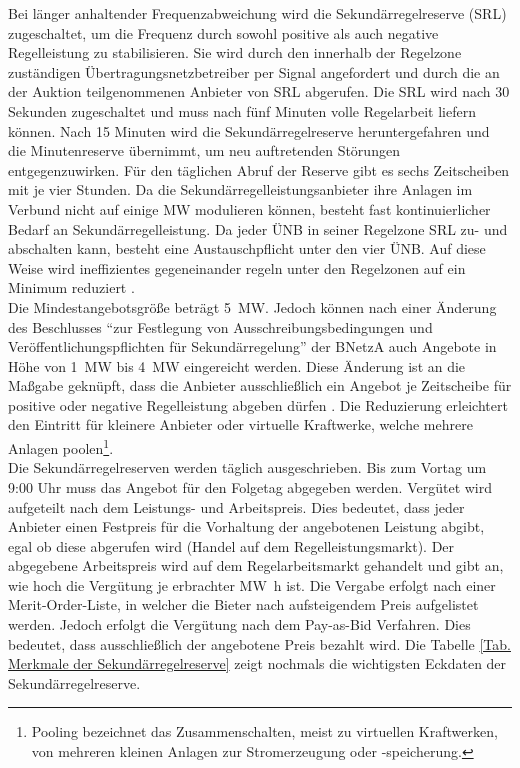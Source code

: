 			Bei länger anhaltender Frequenzabweichung wird die Sekundärregelreserve (SRL) zugeschaltet, um die Frequenz durch sowohl positive als auch negative Regelleistung zu stabilisieren.
			Sie wird durch den innerhalb der Regelzone zuständigen Übertragungsnetzbetreiber per Signal angefordert und durch die an der Auktion teilgenommenen Anbieter von SRL abgerufen. 
			Die SRL wird nach \num{30} Sekunden zugeschaltet und muss nach fünf Minuten volle Regelarbeit liefern können. 
			Nach \num{15} Minuten wird die Sekundärregelreserve heruntergefahren und die Minutenreserve übernimmt, um neu auftretenden Störungen entgegenzuwirken.
			Für den täglichen Abruf der Reserve gibt es sechs Zeitscheiben mit je vier Stunden.
			Da die Sekundärregelleistungsanbieter ihre Anlagen im Verbund nicht auf einige \si{\mega\watt} modulieren können, besteht fast kontinuierlicher Bedarf an Sekundärregelleistung.
			Da jeder ÜNB in seiner Regelzone SRL zu- und abschalten kann, besteht eine Austauschpflicht unter den vier ÜNB.
			Auf diese Weise wird ineffizientes gegeneinander regeln unter den Regelzonen auf ein Minimum reduziert \parencite{SRL_NextKraftwerke}. \\
			
			Die Mindestangebotsgröße beträgt \SI{5}{\mega\watt}.
			Jedoch können nach einer Änderung des Beschlusses "`zur Festlegung von Ausschreibungsbedingungen und Veröffentlichungspflichten für Sekundärregelung"' der BNetzA auch Angebote in Höhe von \SI{1}{\mega\watt} bis \SI{4}{\mega\watt} eingereicht werden.
			Diese Änderung ist an die Maßgabe geknüpft, dass die Anbieter ausschließlich ein Angebot je Zeitscheibe für positive oder negative Regelleistung abgeben dürfen \parencite{Beschluss_SRL}.
			Die Reduzierung erleichtert den Eintritt für kleinere Anbieter oder virtuelle Kraftwerke, welche mehrere Anlagen poolen\footnote{Pooling bezeichnet das Zusammenschalten, meist zu virtuellen Kraftwerken, von mehreren kleinen Anlagen zur Stromerzeugung oder -speicherung.}. \\
			
			Die Sekundärregelreserven werden täglich ausgeschrieben. 
			Bis zum Vortag um 9:00 Uhr muss das Angebot für den Folgetag abgegeben werden.
			Vergütet wird aufgeteilt nach dem Leistungs- und Arbeitspreis.
			Dies bedeutet, dass jeder Anbieter einen Festpreis für die Vorhaltung der angebotenen Leistung abgibt, egal ob diese abgerufen wird (Handel auf dem Regelleistungsmarkt).
			Der abgegebene Arbeitspreis wird auf dem Regelarbeitsmarkt gehandelt und gibt an, wie hoch die Vergütung je erbrachter \si{\mega\watt\hour} ist.
			Die Vergabe erfolgt nach einer Merit-Order-Liste, in welcher die Bieter nach aufsteigendem Preis aufgelistet werden.
			Jedoch erfolgt die Vergütung nach dem Pay-as-Bid Verfahren.
			Dies bedeutet, dass ausschließlich der angebotene Preis bezahlt wird.
			Die Tabelle \ref{Tab. Merkmale der Sekundärregelreserve} zeigt nochmals die wichtigsten Eckdaten der Sekundärregelreserve.
			
